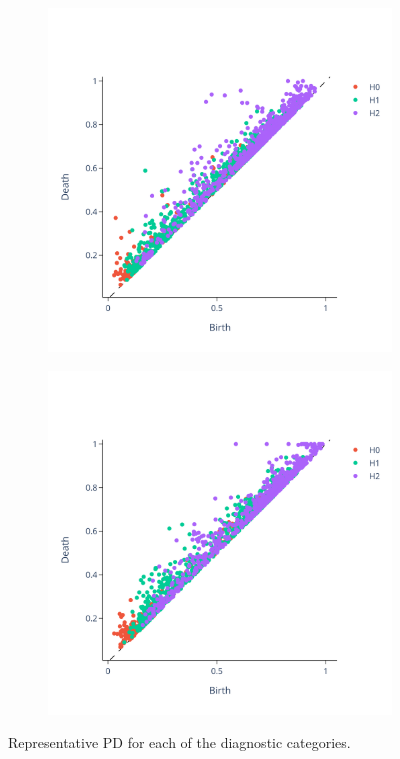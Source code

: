 \documentclass{article}
\begin{document}
\begin{figure}
\begin{subfigure}{0.3\textwidth}
    \includegraphics[width=\textwidth]{figures/PDs/persistence_diagram_MCI.png}
  \end{subfigure}
  \begin{subfigure}{0.3\textwidth}
    \includegraphics[width=\textwidth]{figures/PDs/persistence_diagram_AD.png}
  \end{subfigure}
  \caption{Representative PD for each of the diagnostic categories.}
  \label{fig:sample_rep_pd}
\end{figure}
\end{document}
